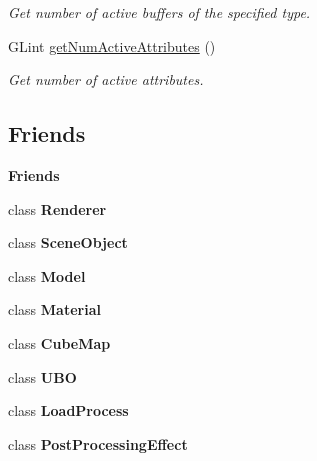 \begin{Indent}
\begin{DoxyCompactItemize}
\begin{DoxyCompactList}\small\item\em Get number of active buffers of the specified type. \end{DoxyCompactList}\item 
\mbox{\label{classrev_1_1_shader_program_a5d75bd8ae1db91e629b096cfbd7cde32}} 
G\+Lint \mbox{\hyperlink{classrev_1_1_shader_program_a5d75bd8ae1db91e629b096cfbd7cde32}{get\+Num\+Active\+Attributes}} ()
\begin{DoxyCompactList}\small\item\em Get number of active attributes. \end{DoxyCompactList}\end{DoxyCompactItemize}
\end{Indent}
\subsection*{Friends}
\begin{Indent}\textbf{ Friends}\par
\begin{DoxyCompactItemize}
\item 
\mbox{\label{classrev_1_1_shader_program_a70538530bc36e033e360880ef311df61}} 
class {\bfseries Renderer}
\item 
\mbox{\label{classrev_1_1_shader_program_a737b3cb474f324a74e7da2d3aeca10c9}} 
class {\bfseries Scene\+Object}
\item 
\mbox{\label{classrev_1_1_shader_program_a2bf2a0e9b454c55aa5dcb5aa4698697b}} 
class {\bfseries Model}
\item 
\mbox{\label{classrev_1_1_shader_program_aa1212b6e372a0f45d2c01f3cd203af77}} 
class {\bfseries Material}
\item 
\mbox{\label{classrev_1_1_shader_program_a83d06bada150194666fdc02c043d1080}} 
class {\bfseries Cube\+Map}
\item 
\mbox{\label{classrev_1_1_shader_program_aeb45b48c2af0875a63f6d247e0eb5334}} 
class {\bfseries U\+BO}
\item 
\mbox{\label{classrev_1_1_shader_program_af08a66cdff89abe314f17f213ef57b66}} 
class {\bfseries Load\+Process}
\item 
\mbox{\label{classrev_1_1_shader_program_a309a88107637acf027e7b995c25a4bff}} 
class {\bfseries Post\+Processing\+Effect}
\end{DoxyCompactItemize}
\end{Indent}
